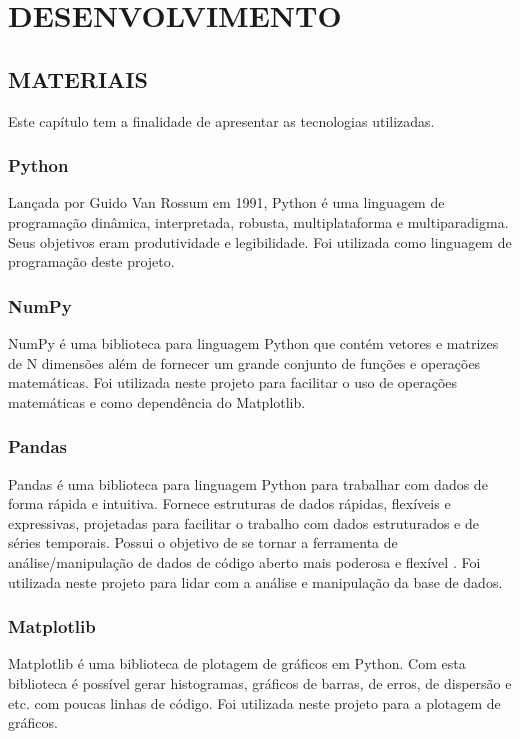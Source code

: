 \section{DESENVOLVIMENTO}

\subsection{MATERIAIS}
	Este capítulo tem a finalidade de apresentar as tecnologias utilizadas.
	
\subsubsection{Python}
	Lançada por Guido Van Rossum em 1991, Python é uma linguagem de programação dinâmica, interpretada, robusta, multiplataforma e multiparadigma. Seus objetivos eram produtividade e legibilidade. Foi utilizada como linguagem de programação deste projeto.
	
\subsubsection{NumPy}
	NumPy é uma biblioteca para linguagem Python que contém vetores e matrizes de N dimensões além de fornecer um grande conjunto de funções e operações matemáticas. Foi utilizada neste projeto para facilitar o uso de operações matemáticas e como dependência do Matplotlib.
	
\subsubsection{Pandas}
	Pandas é uma biblioteca para linguagem Python para trabalhar com dados de forma rápida e intuitiva. Fornece estruturas de dados rápidas, flexíveis e expressivas, projetadas para facilitar o trabalho com dados estruturados e de séries temporais. Possui o objetivo de se tornar a ferramenta de análise/manipulação de dados de código aberto mais poderosa e flexível \cite{PyPIPandas}. Foi utilizada neste projeto para lidar com a análise e manipulação da base de dados.
	
\subsubsection{Matplotlib}
	Matplotlib é uma biblioteca de plotagem de gráficos em Python. Com esta biblioteca é possível gerar histogramas, gráficos de barras, de erros, de dispersão e etc. com poucas linhas de código. Foi utilizada neste projeto para a plotagem de gráficos.

